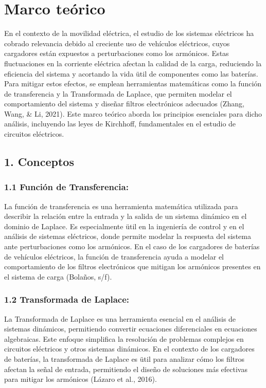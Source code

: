 \section{Marco te\'orico}
\label{sec:marco_teorico}

En el contexto de la movilidad el\'ectrica, el estudio de los sistemas el\'ectricos ha cobrado relevancia debido al creciente uso de veh\'iculos el\'ectricos, cuyos cargadores est\'an expuestos a perturbaciones como los arm\'onicos. Estas fluctuaciones en la corriente el\'ectrica afectan la calidad de la carga, reduciendo la eficiencia del sistema y acortando la vida \"util de componentes como las bater\'ias. Para mitigar estos efectos, se emplean herramientas matem\'aticas como la funci\'on de transferencia y la Transformada de Laplace, que permiten modelar el comportamiento del sistema y dise\~nar filtros electr\'onicos adecuados (Zhang, Wang, \& Li, 2021). Este marco te\'orico aborda los principios esenciales para dicho an\'alisis, incluyendo las leyes de Kirchhoff, fundamentales en el estudio de circuitos el\'ectricos.

\subsection{1. Conceptos}

\subsubsection{1.1 Funci\'on de Transferencia:}
La funci\'on de transferencia es una herramienta matem\'atica utilizada para describir la relaci\'on entre la entrada y la salida de un sistema din\'amico en el dominio de Laplace. Es especialmente \"util en la ingenier\'ia de control y en el an\'alisis de sistemas el\'ectricos, donde permite modelar la respuesta del sistema ante perturbaciones como los arm\'onicos. En el caso de los cargadores de bater\'ias de veh\'iculos el\'ectricos, la funci\'on de transferencia ayuda a modelar el comportamiento de los filtros electr\'onicos que mitigan los arm\'onicos presentes en el sistema de carga (Bola\~nos, s/f).

\subsubsection{1.2 Transformada de Laplace:}
La Transformada de Laplace es una herramienta esencial en el an\'alisis de sistemas din\'amicos, permitiendo convertir ecuaciones diferenciales en ecuaciones algebraicas. Este enfoque simplifica la resoluci\'on de problemas complejos en circuitos el\'ectricos y otros sistemas din\'amicos. En el contexto de los cargadores de bater\'ias, la transformada de Laplace es \"util para analizar c\'omo los filtros afectan la se\~nal de entrada, permitiendo el dise\~no de soluciones m\'as efectivas para mitigar los arm\'onicos (L\'azaro et al., 2016).

